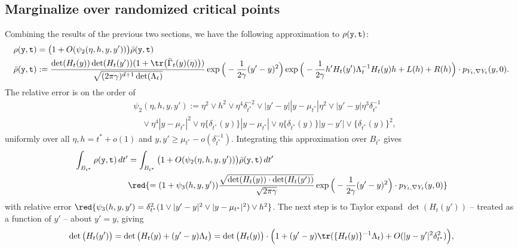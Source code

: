 \documentclass{article}
\begin{document}
	\subsection{Marginalize over randomized critical points}
	Combining the results of the previous two sections, we have the following approximation to $\rho({\tt y},{\tt t})$:
	\begin{equation*}
		\begin{aligned}
			\rho({\tt y},{\tt t}) & = \big(1 + O(\psi_2(\eta,h,y,y'))\big) \bar{\rho}({\tt y},{\tt t}) \\
			\bar{\rho}({\tt y},{\tt t}) & := \frac{\det(H_t(y))\det(H_t(y'))(1 + \tr\big(\bar{\Gamma}_t(y)(\eta)\big))}{\sqrt{(2 \pi \gamma)^{d + 1} \det(\Lambda_t)}} \exp\Big(-\frac{1}{2\gamma}(y' - y)^2\Big) \exp\Big(-\frac{1}{2\gamma}h'H_t(y')\Lambda_{t}^{-1}H_t(y)h + L(h) + R(h)\Big) \cdot p_{Y_t,\nabla Y_t}(y,0).
		\end{aligned}
	\end{equation*}
	The relative error is on the order of 
	\begin{align*}
		& \psi_2(\eta,h,y,y') := \eta^2 \vee h^2 \vee \eta^4 \delta_{t^*}^{-2} \vee |y' - y||y - \mu_{t^*}| \eta^2 \vee |y' - y|\eta^3 \delta_{t^*}^{-1} \\
		& \quad \vee \eta^4 |y - \mu_{t^*}|^2 \vee \eta\{\delta_{t^*}(y)\}|y - \mu_{t^*}| \vee \eta\{\delta_{t^*}(y)\}|y - y'| \vee \{\delta_{t^*}(y)\}^2,
	\end{align*} 
	uniformly over all $\eta,h = t^* + o(1)$ and $y,y' \geq \mu_{t^*} - o(\delta_{t^*}^{-1})$. Integrating this approximation over $B_{t^*}$ gives
	\begin{equation*}
		\begin{aligned}
			\int_{B_{t^*}} \rho({\tt y},{\tt t}) \,dt' 
			& = \int_{B_{t^*}} \big(1 + O(\psi_2(\eta,h,y,y'))\big) \bar{\rho}({\tt y},{\tt t}) \,dt' \\
			& \red{= (1 + \psi_3(h,y,y'))\frac{\sqrt{\det(H_t(y)) \cdot \det(H_t(y'))}}{\sqrt{2 \pi \gamma}} \exp\Big(-\frac{1}{2\gamma}(y' - y)^2\Big) \cdot p_{Y_t,\nabla Y_t}(y,0)}
		\end{aligned}
	\end{equation*}
	with relative error $\red{\psi_3(h,y,y') = \delta_{t^*}^2(1 \vee |y' - y|^2 \vee |y - \mu_{t^*}|^2) \vee h^2}$. The next step is to Taylor expand $\det(H_{t}(y'))$ -- treated as a function of $y'$ -- about $y' = y$, giving
	\begin{equation*}
		\det\big(H_{t}(y')\big) = \det\big(H_t(y) + (y' - y)\Lambda_t\big) = \det\big(H_t(y)\big) \cdot \Big(1 + (y' - y)\tr(\{H_t(y)\}^{-1}\Lambda_t) + O(|y - y'|^2\delta_{t^*}^2)\Big),
	\end{equation*}
\end{document}
